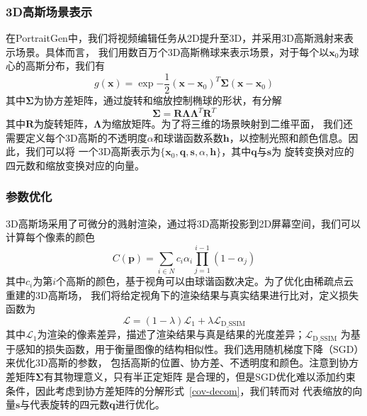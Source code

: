 \subsubsection{3D高斯场景表示}
在PortraitGen中，我们将视频编辑任务从2D提升至3D，并采用3D高斯溅射来表示场景。具体而言，
我们用数百万个3D高斯椭球来表示场景，对于每个以$\symbf{x}_0$为球心的高斯分布，我们有
\begin{equation}
    g(\symbf{x})=\exp{-\frac{1}{2}(\symbf{x}-\symbf{x}_0)^T\symbf{\Sigma}(\symbf{x}-\symbf{x}_0)}
\end{equation}
其中$\symbf{\Sigma}$为协方差矩阵，通过旋转和缩放控制椭球的形状，有分解
\begin{equation}
    \symbf{\Sigma}=\symbf{R}\symbf{\Lambda}\symbf{\Lambda}^T\symbf{R}^T
    \label{cov-decom}
\end{equation}
其中$\symbf{R}$为旋转矩阵，$\symbf{\Lambda}$为缩放矩阵。为了将三维的场景映射到二维平面，
我们还需要定义每个3D高斯的不透明度$\alpha$和球谐函数系数$\symbf{h}$，以控制光照和颜色信息。因此，我们可以将
一个3D高斯表示为$\{\symbf{x}_0,\symbf{q},\symbf{s},\alpha,\symbf{h} \}$，其中$\symbf{q}$与$\symbf{s}$为
旋转变换对应的四元数和缩放变换对应的向量。

\subsubsection{参数优化}
3D高斯场采用了可微分的溅射渲染，通过将3D高斯投影到2D屏幕空间，我们可以计算每个像素的颜色
\begin{equation}
    C(\symbf{p})=\sum_{i\in N}c_i\alpha_i\prod_{j=1}^{i-1}(1-\alpha_j)
\end{equation}
其中$c_i$为第$i$个高斯的颜色，基于视角可以由球谐函数决定。为了优化由稀疏点云重建的3D高斯场，
我们将给定视角下的渲染结果与真实结果进行比对，定义损失函数为
\begin{equation}
    \mathcal{L}=(1-\lambda)\mathcal{L}_1+\lambda\mathcal{L}_\text{D\_SSIM}
\end{equation}
其中$\mathcal{L}_1$为渲染的像素差异，描述了渲染结果与真是结果的光度差异；$\mathcal{L}_\text{D\_SSIM}$
为基于感知的损失函数，用于衡量图像的结构相似性。我们选用随机梯度下降（SGD）来优化3D高斯的参数，
包括高斯的位置、协方差、不透明度和颜色。注意到协方差矩阵$\symbf{\Sigma}$有其物理意义，只有半正定矩阵
是合理的，但是SGD优化难以添加约束条件，因此考虑到协方差矩阵的分解形式~\eqref{cov-decom}，我们转而对
代表缩放的向量$\symbf{s}$与代表旋转的四元数$\symbf{q}$进行优化。


